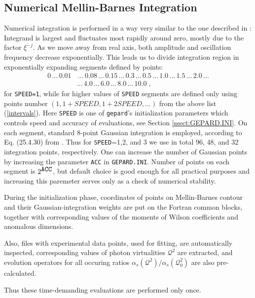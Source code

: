 \documentclass[12pt]{article}
\begin{document}
\subsection{Numerical Mellin-Barnes Integration}  
\label{ssect:Integration}
Numerical integration is performed in a way very similar to the one described in
\cite{Vogt:2004ns}: Integrand is largest and
fluctuates most rapidly around zero, mostly due to the factor $\xi^{-j}$. As we
move away from real axis, both
amplitude and oscillation frequency decrease exponentially.
This leads us to divide integration region in exponentially expanding segments
defined by points:
\begin{align}
0 \,\ldots\, 0.01 & \,\ldots\, 0.08 \,\ldots\, 0.15 \,\ldots\, 0.3\,\ldots\, 0.5\,\ldots\, 
1.0\,\ldots\, 1.5\,\ldots\, 2.0 \, \ldots  \nonumber \\
 & \ldots  \, 4.0 \, \ldots\, 6.0 \, \ldots\, 8.0 \, \ldots \, 10.0 \;,
\label{intervals}
\end{align}
for \texttt{SPEED=1}, while for higher values of \texttt{SPEED} segments
are defined only using points number $(1, 1+SPEED, 1+ 2 SPEED, \ldots)$ from
the above list (\ref{intervals}).
Here \texttt{SPEED} is one of \texttt{gepard}'s initialization parameters which
controls speed and accuracy of evaluations, see Section \ref{ssect:GEPARD.INI}.
On each segment, standard 8-point Gaussian integration is employed, according
to Eq. (25.4.30) from \cite{AbS65}.
Thus for \texttt{SPEED}=1,2, and 3 we use in total 96, 48, and 32
integration points, respectively. 
One can increase the number of Gaussian points by increasing the parameter
\texttt{ACC} in \texttt{GEPARD.INI}. Number of points on each segment
is $2^{\mbox{\texttt{ACC}}}$,
but default choice is good enough for all practical purposes and increasing this
paremeter serves only as a check of numerical stability.

During the initialization phase, coordinates of points on Mellin-Barnes contour and 
their Gaussian-integration weights
are put on the Fortran common blocks, together with corresponding values of
the moments of Wilson coefficients and anomalous dimensions. 

Also, files with experimental data points, used for fitting, are automatically
inspected, corresponding values of photon virtualities $\mathcal{Q}^2$ are
extracted, and evolution operators for all occuring ratios
$\alpha_{s}(\mathcal{Q}^2)/\alpha_{s}(\mathcal{Q}^{2}_0)$ are also pre-calculated.

Thus these time-demanding evaluations are performed only once.
\end{document}
